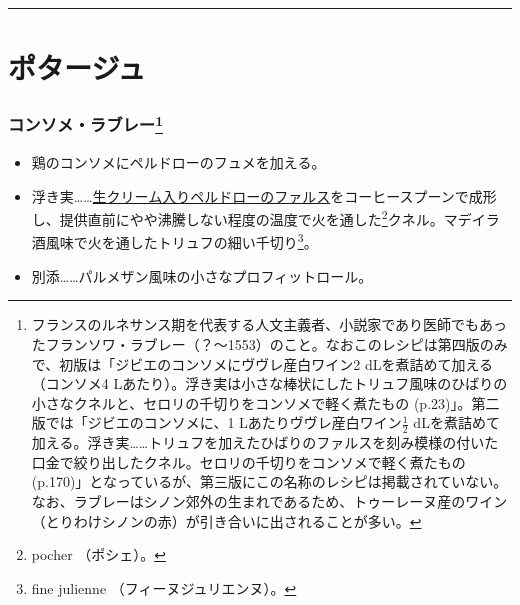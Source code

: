 \begin{center}\rule{0.5\linewidth}{\linethickness}\end{center}

\hypertarget{Potages}{%
\section{ポタージュ}\label{Potages}}

\hypertarget{consomme-rabelais}{%
\subsubsection[コンソメ・ラブレー]{\texorpdfstring{コンソメ・ラブレー\footnote{フランスのルネサンス期を代表する人文主義者、小説家であり医師でもあったフランソワ・ラブレー（？〜1553）のこと。なおこのレシピは第四版のみで、初版は「ジビエのコンソメにヴヴレ産白ワイン2
  dLを煮詰めて加える（コンソメ4
  Lあたり）。浮き実は小さな棒状にしたトリュフ風味のひばりの小さなクネルと、セロリの千切りをコンソメで軽く煮たもの
  (p.23)」。第二版では「ジビエのコンソメに、1
  Lあたりヴヴレ産白ワイン\(\frac{1}{2}\)
  dLを煮詰めて加える。浮き実\ldots{}\ldots{}トリュフを加えたひばりのファルスを刻み模様の付いた口金で絞り出したクネル。セロリの千切りをコンソメで軽く煮たもの(p.170)」となっているが、第三版にこの名称のレシピは掲載されていない。なお、ラブレーはシノン郊外の生まれであるため、トゥーレーヌ産のワイン（とりわけシノンの赤）が引き合いに出されることが多い。}}{コンソメ・ラブレー}}\label{consomme-rabelais}}

\begin{itemize}
\item
  鶏のコンソメにペルドローのフュメを加える。
\item
  浮き実\ldots{}\ldots{}\protect\hyperlink{farce-c}{生クリーム入りペルドローのファルス}をコーヒースプーンで成形し、提供直前にやや沸騰しない程度の温度で火を通した\footnote{pocher
    （ポシェ）。}クネル。マデイラ酒風味で火を通したトリュフの細い千切り\footnote{fine
    julienne （フィーヌジュリエンヌ）。}。
\item
  別添\ldots{}\ldots{}パルメザン風味の小さなプロフィットロール。
\end{itemize}

